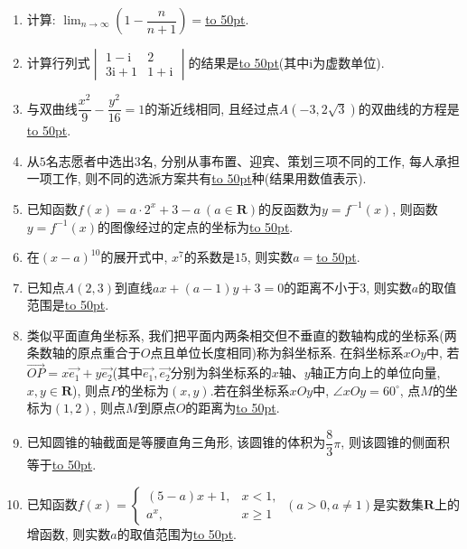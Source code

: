 \documentclass[10pt,a4paper]{article}
\newcommand{\blank}[1]{\underline{\hbox to #1pt{}}}
\begin{document}
\begin{enumerate}[1.]
\item 计算: $\displaystyle\lim_{n\to\infty}(1-\dfrac n{n+1})=$\blank{50}.
\item 计算行列式$\begin{vmatrix} 1-\mathrm{i} & 2 \\ 3\mathrm{i}+1 & 1+\mathrm{i}\end{vmatrix}$的结果是\blank{50}(其中$\mathrm{i}$为虚数单位).
\item 与双曲线$\dfrac{x^2}9-\dfrac{y^2}{16}=1$的渐近线相同, 且经过点$A(-3,2 \sqrt3)$的双曲线的方程是\blank{50}.
\item 从$5$名志愿者中选出$3$名, 分别从事布置、迎宾、策划三项不同的工作, 每人承担一项工作, 则不同的选派方案共有\blank{50}种(结果用数值表示).
\item 已知函数$f(x)=a\cdot 2^x+3-a\ (a\in \mathbf{R})$的反函数为$y=f^{-1}(x)$, 则函数$y=f^{-1}(x)$的图像经过的定点的坐标为\blank{50}.
\item 在$(x-a)^{10}$的展开式中, $x^7$的系数是$15$, 则实数$a=$\blank{50}.
\item 已知点$A(2,3)$到直线$ax+(a-1)y+3=0$的距离不小于$3$, 则实数$a$的取值范围是\blank{50}.
\item 类似平面直角坐标系, 我们把平面内两条相交但不垂直的数轴构成的坐标系(两条数轴的原点重合于$O$点且单位长度相同)称为斜坐标系. 在斜坐标系$xOy$中, 若$\overrightarrow{OP}=x\overrightarrow{e_1}+y\overrightarrow{e_2}$(其中$\overrightarrow{e_1},\overrightarrow{e_2}$分别为斜坐标系的$x$轴、$y$轴正方向上的单位向量, $x,y\in \mathbf{R}$), 则点$P$的坐标为$(x,y)$.若在斜坐标系$xOy$中, $\angle xOy=60^\circ$, 点$M$的坐标为$(1,2)$, 则点$M$到原点$O$的距离为\blank{50}.
\item 已知圆锥的轴截面是等腰直角三角形, 该圆锥的体积为$\dfrac83\pi$, 则该圆锥的侧面积等于\blank{50}.
\item  已知函数$f(x)=\begin{cases} (5-a)x+1, & x<1, \\ a^x, & x\ge 1\end{cases} \ (a>0,a\ne 1)$是实数集$\mathbf{R}$上的增函数, 则实数$a$的取值范围为\blank{50}.



\end{enumerate}
\end{document}
